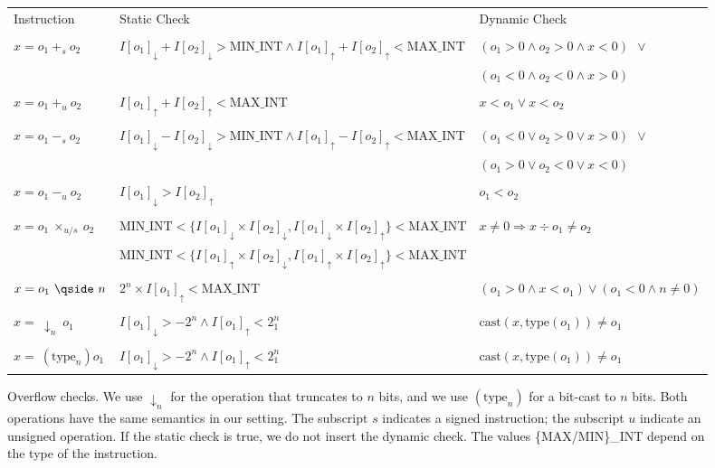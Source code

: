 \documentclass[preprint]{sigplanconf}[10pt]
\newcommand{\lb}[1]{#1_{\downarrow}}
\newcommand{\ub}[1]{#1_{\uparrow}}
\begin{document}
\begin{figure}[t!]
\begin{center}
\begin{tabular}{lll}
Instruction & Static Check & Dynamic Check \\ \\
$x = o_1 \ +_s \ o_2$ & $\lb{I[o_1]} + \lb{I[o_2]} > \mbox{MIN\_INT} \wedge \ub{I[o_1]} + \ub{I[o_2]} < \mbox{MAX\_INT}$ & $(o_1 > 0 \wedge o_2 > 0 \wedge x < 0) \ \ \vee$ \\
                  & & $(o_1 < 0 \wedge o_2 < 0 \wedge x > 0)$ \\ \\
$x = o_1 \ +_u \ o_2$ & $\ub{I[o_1]} + \ub{I[o_2]} < \mbox{MAX\_INT}$ & $x < o_1 \vee x < o_2$ \\ \\
$x = o_1 \ -_s \ o_2$ & $\lb{I[o_1]} - \lb{I[o_2]} > \mbox{MIN\_INT} \wedge \ub{I[o_1]} - \ub{I[o_2]} < \mbox{MAX\_INT}$ & $(o_1 < 0 \vee o_2 > 0 \vee x > 0) \ \ \vee$ \\
                      & & $(o_1 > 0 \vee o_2 < 0 \vee x < 0)$ \\ \\
$x = o_1 \ -_u \ o_2$ & $\lb{I[o_1]} > \ub{I[o_2]}$ & $o_1 < o_2$ \\ \\
$x = o_1 \ \times_{u/s} \ o_2$ & $\mbox{MIN\_INT} < \{ \lb{I[o_1]} \times \lb{I[o_2]}, \lb{I[o_1]} \times \ub{I[o_2]} \}< \mbox{MAX\_INT}$ & $x \neq 0 \Rightarrow x \div o_1 \neq o_2$ \\
                       & $\mbox{MIN\_INT} < \{ \ub{I[o_1]}\times \lb{I[o_2]}, \ub{I[o_1]}\times \ub{I[o_2]} \}< \mbox{MAX\_INT}$ & \\ \\
$x = o_1 \ \qside \ n$ & $2^n \times \ub{I[o_1]} < \mbox{MAX\_INT}$ & $(o_1 > 0 \wedge x < o_1) \vee (o_1 < 0 \wedge n \neq 0)$ \\ \\
$x = \ \downarrow_n \ o_1$  & $\lb{I[o_1]} > -2^n \wedge \ub{I[o_1]} < 2^n_1$ & $\mbox{cast}(x, \mbox{type}(o_1)) \neq o_1$ \\ \\
$x = \ (\mbox{type}_n) o_1$ & $\lb{I[o_1]} > -2^n \wedge \ub{I[o_1]} < 2^n_1$ & $\mbox{cast}(x, \mbox{type}(o_1)) \neq o_1$ \\
\end{tabular}
\end{center}
\caption{\label{fig:instrumentation}Overflow checks. We use $\downarrow_n$ for
the operation that truncates to $n$ bits, and we use $(\mbox{type}_n)$ for a
bit-cast to $n$ bits. Both operations have the same semantics in our setting.
The subscript $s$ indicates a signed instruction; the subscript $u$ indicate
an unsigned operation. If the static check is true, we do not insert the dynamic
check. The values \{MAX/MIN\}\_INT depend on the type of the instruction.}
\end{figure}
\end{document}

